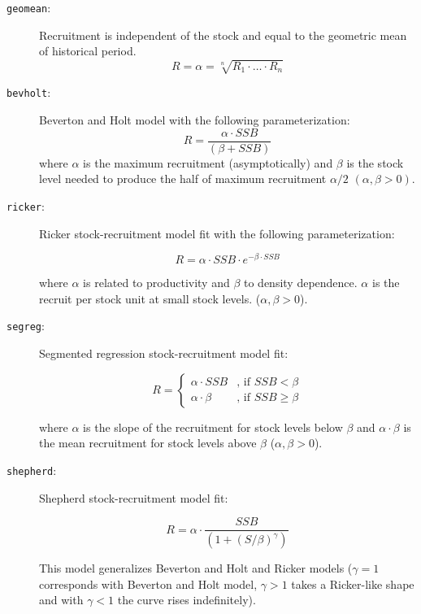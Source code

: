 	\begin{description}

		\item[\texttt{geomean}:] Recruitment is independent of the stock and equal to the geometric mean
	      of historical period.
	      		      $$ R = \alpha = \sqrt[n]{R_1\cdot\ldots\cdot R_n}$$

		\item[\texttt{bevholt}:] Beverton and Holt model with the following parameterization:
						$$ R = \frac{\alpha\cdot SSB}{(\beta + SSB)}$$
          where $\alpha$ is the maximum recruitment (asymptotically) and $\beta$ is
          the stock level needed to produce the half of maximum
          recruitment $\alpha /2$ $(\alpha, \beta >0)$.

		\item[\texttt{ricker}:] Ricker stock-recruitment model fit with the following parameterization:

                                $$R = \alpha\cdot SSB\cdot e^{-\beta\cdot SSB}$$

          where $\alpha$ is related to productivity and $\beta$ to density dependence.
          $\alpha$  is the recruit per stock unit at small stock levels. ($\alpha, \beta > 0$).

		\item[\texttt{segreg}:] Segmented regression stock-recruitment model fit:

                           \[
 							R = \begin{cases}
   									\alpha\cdot SSB       & \text{, if } SSB < \beta \\
   									\alpha\cdot \beta     & \text{, if } SSB \geq \beta
  								\end{cases}
							\]

          where $\alpha$ is the slope of the recruitment for stock levels below
          $\beta$ and $\alpha\cdot \beta $ is the mean recruitment for stock levels above
          $\beta$ ($\alpha, \beta > 0$).

		\item[\texttt{shepherd}:] Shepherd stock-recruitment model fit:

                              $$ R = \alpha \cdot \frac{SSB}{(1 + (S/\beta)^\gamma)}$$

          This model generalizes Beverton and Holt and Ricker models ($\gamma = 1$ corresponds with
          Beverton and Holt model, $\gamma > 1$ takes a Ricker-like shape and with $\gamma < 1$
          the curve rises indefinitely).


\end{description}

